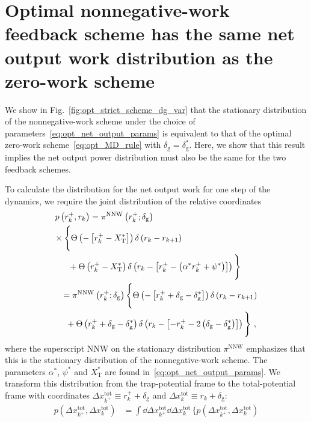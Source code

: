 \documentclass[%
reprint,
bibnotes, amsmath, amssymb, aps, pre,
 showkeys,
floatfix
]{revtex4-2}
\newcommand{\mrm}{\mathrm}
\newcommand{\pr}[1]{\left(#1\right)} %
\newcommand{\sr}[1]{\left[#1\right]} %
\newcommand{\dg}{\delta_{\mrm{g}}}
\newcommand{\xkr}{r_{k}}
\newcommand{\xkrp}{r_{k+1}}
\newcommand{\xkpr}{r_{k}^{+}}
\newcommand{\xkrt}{\Delta x_{k}^{\mrm{tot}}}
\newcommand{\xkprt}{\Delta x_{k^{+}}^{\mrm{tot}}}
\newcommand{\xT}{X_{\mrm{T}}}
\begin{document}
{\color{black} 
\section{Optimal nonnegative-work feedback scheme has the same net output work distribution as the zero-work scheme}
\label{sec:work_distributions}

We show in Fig.~\ref{fig:opt_strict_scheme_dg_var} that the stationary distribution of the nonnegative-work scheme under the choice of 
parameters~\eqref{eq:opt_net_output_params} is equivalent to that of the optimal zero-work scheme~\eqref{eq:opt_MD_rule} with $\dg = \dg^{*}$. 
Here, we show that this result implies the net output power distribution must also be the same for the two feedback schemes. 

To calculate the distribution for the net output work for one step of the dynamics, we require the joint distribution of the relative coordinates
\begin{align}
    p\pr{\xkpr, \xkr} &= \pi^{\mrm{NNW}}\pr{\xkpr; \dg}\nonumber\\
    &\hspace{-1.5cm}\times\Bigg\{\Theta\pr{-\sr{\xkpr-\xT^{*}}}\delta\pr{\xkr-\xkrp}\\
    &\hspace{-0.9cm}+ \Theta\pr{\xkpr-\xT^{*}}\delta\pr{\xkr-\sr{\xkpr-\pr{\alpha^{*}\xkpr+\psi^{*}}}}\Bigg\}\nonumber\\
    &\hspace{-1.2cm} = \pi^{\mrm{NNW}}\pr{\xkpr;\dg}\Bigg\{\Theta\pr{-\sr{\xkpr+\dg-\dg^{*}}}\delta\pr{\xkr-\xkrp}\nonumber\\
    &\hspace{-1cm}+ \Theta\pr{\xkpr+\dg-\dg^{*}}\delta\pr{\xkr-\sr{-\xkpr-2\pr{\dg-\dg^{*}}}}\Bigg\}\ ,
\end{align}
where the superscript NNW on the stationary distribution $\pi^{\mrm{NNW}}$ emphasizes that this is the stationary distribution of the nonnegative-work scheme. 
The parameters $\alpha^{*}$, $\psi^{*}$ and $\xT^{*}$ are found in~\eqref{eq:opt_net_output_params}.
We transform this distribution from the trap-potential frame to the total-potential frame with coordinates $\xkprt\equiv \xkpr + \dg$ and $\xkrt\equiv r_{k}+\dg$:
\begin{subequations}\label{eq:s_joint_distribution}
    \begin{align}
        p\pr{\xkprt, \xkrt} &= \int\dd{\xkprt}\dd{\xkrt}\, \Bigg\{p\pr{\xkprt, \xkrt}\nonumber\\

\end{align}
\end{subequations}}
\end{document}
